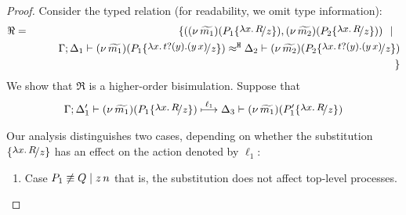 \begin{proof}
	Consider the typed relation (for readability, we omit type information):
	\begin{eqnarray*}
		\Re	&=&	\set{
					(\newsp{\widetilde{m_1}}{P_1 \subst{{\abs{x}{R}}}{z}}, \newsp{\widetilde{m_2}}{P_2 \subst{{\abs{x}{R}}}{z}})
					\setbar\\
			&&		\qquad \horel{\Gamma}{\Delta_1}{\newsp{\widetilde{m_1}}{P_1 \subst{\trvalx{t}}{z} }}
					{\hwb}
					{\Delta_2}{\newsp{\widetilde{m_2}}{P_2 \subst{\trvalx{t}}{z} }}
			\\
			&&		}
	\end{eqnarray*}
	We show that $\Re$ is a higher-order bisimulation. Suppose that 
	\begin{eqnarray}
		\horel{\Gamma}{\Delta_1'}{\newsp{\widetilde{m_1}}{P_1 \subst{{\abs{x}{R}}}{z} }}
		{\hby{\ell_1}}
		{\Delta_3}{\newsp{\widetilde{m_1}}{P_1' \subst{{\abs{x}{R}}}{z} }}
		\label{lem:proc_subst1}
	\end{eqnarray}

	Our analysis distinguishes two cases, depending on whether the substitution $\subst{{\abs{x}{R}}}{z}$ has an effect on the action denoted by $\ell_1$:
	\begin{enumerate}
		\item	Case $P_1 \not\equiv Q \;|\; z\, {n}$ that is,
				the substitution does not affect top-level processes. 


\end{enumerate}
\end{proof}
